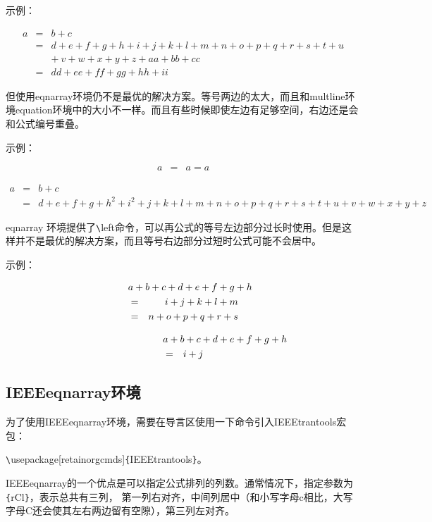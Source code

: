 \documentclass[UTF8]{ctexart}
\begin{document}
示例：

\begin{eqnarray}
  a & = & b + c\\
  & = & d +e + f + g + h + i + j + k + l + m + n + o + p + q + r + s + t + u \nonumber \\
  && +\: v + w + x + y + z + aa + bb + cc \\
  & = & dd + ee + ff + gg + hh + ii
\end{eqnarray}

但使用eqnarray环境仍不是最优的解决方案。等号两边的太大，而且和multline环境equation环境中的大小不一样。而且有些时候即使左边有足够空间，右边还是会和公式编号重叠。

示例：

\begin{eqnarray}
  a & = & a = a
\end{eqnarray}

\begin{eqnarray}
  a & = & b + c
  \\
  & = & d +e + f + g + h^2 + i^2 + j + k + l + m + n + o + p + q + r + s + t + u + v
    + w + x + y + z
  \label{eq:faultyeqnarray}
\end{eqnarray}

eqnarray 环境提供了\texttt{\textbackslash}left命令，可以再公式的等号左边部分过长时使用。但是这样并不是最优的解决方案，而且等号右边部分过短时公式可能不会居中。

示例：

\begin{eqnarray}
  \lefteqn{a + b + c + d + e + f + g + h} \nonumber \\
  & = & i + j + k + l + m \\
  & = & n + o + p + q + r + s
\end{eqnarray}

\begin{eqnarray}
   \lefteqn{a + b + c + d + e + f + g + h} \nonumber \\
   & = & i + j
\end{eqnarray}

\subsection{IEEEeqnarray环境}
为了使用IEEEeqnarray环境，需要在导言区使用一下命令引入IEEEtrantools宏包：

 \texttt{\textbackslash}usepackage[retainorgcmds]\texttt{\{}IEEEtrantools\texttt{\}}。

IEEEeqnarray的一个优点是可以指定公式排列的列数。通常情况下，指定参数为\texttt{\{}rCl\texttt{\}}，表示总共有三列，
第一列右对齐，中间列居中（和小写字母c相比，大写字母C还会使其左右两边留有空隙），第三列左对齐。
\end{document}
